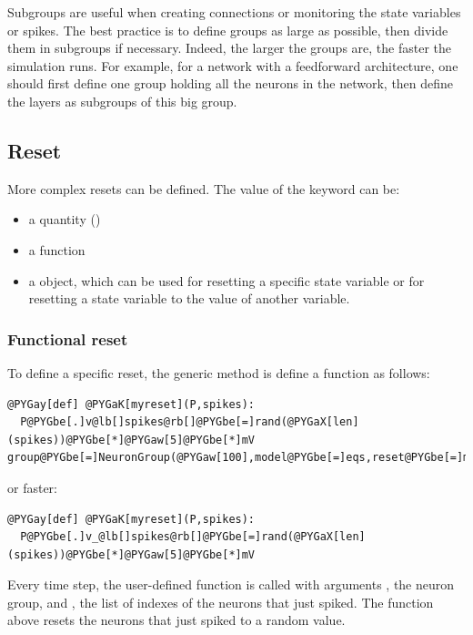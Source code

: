 \documentclass[letterpaper,10pt]{manual}
\begin{document}
Subgroups are useful when creating connections or monitoring the state variables or spikes.
The best practice is to define groups as large as possible, then divide them in subgroups if necessary.
Indeed, the larger the groups are, the faster the simulation runs. For example, for a network with a feedforward
architecture, one should first define one group holding all the neurons in the network, then define the layers as
subgroups of this big group.


\subsection{Reset}

More complex resets can be defined. The value of the  keyword can be:
\begin{itemize}
\item {} 
a quantity ()

\item {} 
a function

\item {} 
a \hyperlink{brian.Reset}{} object, which can be used for resetting a specific state variable or
for resetting a state variable to the value of another variable.

\end{itemize}


\subsubsection{Functional reset}

To define a specific reset, the generic method is define a function as follows:

\begin{Verbatim}[commandchars=@\[\]]
@PYGay[def] @PYGaK[myreset](P,spikes):
  P@PYGbe[.]v@lb[]spikes@rb[]@PYGbe[=]rand(@PYGaX[len](spikes))@PYGbe[*]@PYGaw[5]@PYGbe[*]mV
group@PYGbe[=]NeuronGroup(@PYGaw[100],model@PYGbe[=]eqs,reset@PYGbe[=]myreset,threshold@PYGbe[=]@PYGaw[10]@PYGbe[*]mV)
\end{Verbatim}

or faster:

\begin{Verbatim}[commandchars=@\[\]]
@PYGay[def] @PYGaK[myreset](P,spikes):
  P@PYGbe[.]v_@lb[]spikes@rb[]@PYGbe[=]rand(@PYGaX[len](spikes))@PYGbe[*]@PYGaw[5]@PYGbe[*]mV
\end{Verbatim}

Every time step, the user-defined function is called with arguments
, the neuron group, and , the list of indexes of the neurons that just spiked.
The function above resets the neurons that just spiked to a random value.
\end{document}
